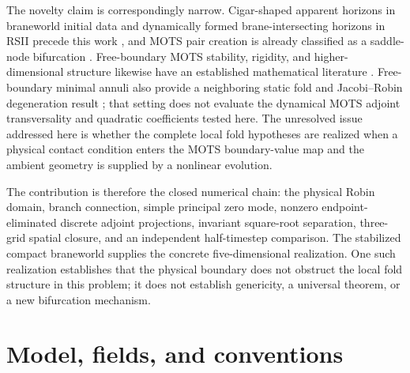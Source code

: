 \documentclass[11pt]{article}
\begin{document}
The novelty claim is correspondingly narrow.  Cigar-shaped apparent horizons
in braneworld initial data and dynamically formed brane-intersecting horizons
in RSII precede this work \cite{ShiromizuShibata2000,WangChoptuik2016}, and
MOTS pair creation is already classified as a saddle-node bifurcation
\cite{BoothCoxOkpala2026}.  Free-boundary MOTS stability, rigidity, and
higher-dimensional structure likewise have an established mathematical
literature
\cite{AlaeeLesourdYau2020,Chai2024,Mendes2021,Lee2025,deAlmeidaMendes2026}.
Free-boundary minimal annuli also provide a neighboring static fold and
Jacobi--Robin degeneration result \cite{Pigazzini2026}; that setting does not
evaluate the dynamical MOTS adjoint transversality and quadratic coefficients
tested here.
The unresolved issue addressed here is whether the complete local fold
hypotheses are realized when a physical contact condition enters the MOTS
boundary-value map and the ambient geometry is supplied by a nonlinear
evolution.

The contribution is therefore the closed numerical chain: the physical Robin
domain, branch connection, simple principal zero mode, nonzero
endpoint-eliminated discrete adjoint projections, invariant square-root
separation, three-grid spatial closure, and an independent half-timestep
comparison.  The stabilized compact braneworld supplies the concrete
five-dimensional realization.  One such realization establishes that the
physical boundary does not obstruct the local fold structure in this problem;
it does not establish genericity, a universal theorem, or a new bifurcation
mechanism.

\section{Model, fields, and conventions}
\end{document}
